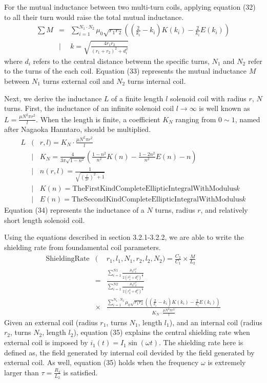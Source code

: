 For the mutual inductance between two multi-turn coils,
applying equation (32) to all their turn would raise the total mutual inductance.
\begin{eqnarray}
  \sum M &=& \sum_{i=1}^{N_1\cdot N_2}\mu_0\sqrt{r_1r_2}\left( (\frac{2}{k_i}-k_i)K(k_i) - \frac{2}{k_i}E(k_i) \right)\nonumber\\
  &|& k = \sqrt{\frac{4r_1r_2}{(r_1+r_2)^2 + d_i^2}}
\end{eqnarray}
where $d_i$ refers to the central distance betwenn the specific turns,
$N_1$ and $N_2$ refer to the turns of the each coil.
Equation (33) represents the mutual inductance $M$ between $N_1$ turns external coil and $N_2$ turns internal coil.


Next, we derive the inductance $L$ of a finite length $l$ solenoid coil with radius $r$, $N$ turns.
First, the inductance of an infinite solenoid coil $l \to \infty$ is well known as $L = \frac{\mu N^2\pi r^2}{l}$.
When the length is finite, a coefficient $K_N$ ranging from $0\sim1$, named after Nagaoka Hanntaro, should be multiplied.
\begin{eqnarray}
  L&(&r, l) = K_N\cdot\frac{\mu N^2\pi r^2}{l}\\
  &|& K_N = \frac{4}{3\pi\sqrt{1-n^2}}\left( \frac{1-n^2}{n^2}K(n) - \frac{1-2n^2}{n^2}E(n) - n \right)\nonumber\\
  &|& n(r, l) = \frac{1}{\sqrt{(\frac{l}{2r})^2 + 1}}\nonumber\\
  &|& K(n) = \mathrm{TheFirstKindCompleteEllipticIntegralWithModulus} k\nonumber\\
  &|& E(n) = \mathrm{TheSecondKindCompleteEllipticIntegralWithModulus} k\nonumber
\end{eqnarray}
Equation (34) represents the inductance of a $N$ turns, radius $r$, and relatively short length solenoid coil.


Using the equations described in section 3.2.1-3.2.2,
we are able to write the shielding rate from foundamental coil parameters.
\begin{eqnarray}
  \mathrm{Shielding Rate}&(&r_1, l_1, N_1, r_2, l_2, N_2) = \frac{C_2}{C_1}\times\frac{M}{L_2}\\
  &=& \frac{\sum_{i=1}^{N1} \frac{\mu_0r_1^2}{2\left(r_1^2 + d_i^2\right)^{\frac{3}{2}}}}{\sum_{i=1}^{N2} \frac{\mu_0r_2^2}{2\left(r_2^2 + d_i^2\right)^{\frac{3}{2}}}}\nonumber\\
  &\times& \frac{\sum_{i=1}^{N_1\cdot N_2}\mu_0\sqrt{r_1r_2}\left( (\frac{2}{k_i}-k_i)K(k_i) - \frac{2}{k_i}E(k_i) \right)}{K_N\cdot\frac{\mu N^2\pi r^2}{l}}\nonumber
\end{eqnarray}
Given an external coil (radius $r_1$, turns $N_1$, length $l_1$),
and an internal coil (radius $r_2$, turns $N_2$, length $l_2$),
equation (35) explains the central shielding rate when external coil is imposed by $i_1(t) = I_1\sin(\omega t)$.
The shielding rate here is defined as, the field generated by internal coil devided by the field generated by external coil.
As well, equation (35) holds when the frequency $\omega$ is extremely larger than $\tau=\frac{R_2}{L_2}$ is satisfied.

